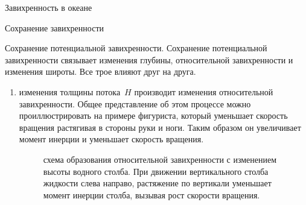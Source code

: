 \begin{chapter}{Завихренность в океане}
\begin{section}{Сохранение завихренности}
\begin{paragraph}{Сохранение потенциальной завихренности.}
Сохранение потенциальной завихренности связывает изменения глубины,
относительной завихренности и изменения широты. Все трое влияют друг
на друга.
%
\begin{enumerate}
\item
изменения толщины потока~$H$ производит изменения относительной
завихренности. Общее представление об этом процессе можно
проиллюстрировать на примере фигуриста, который уменьшает скорость
вращения растягивая в стороны руки и ноги. Таким образом он
увеличивает момент инерции и уменьшает скорость вращения.
%
%
\begin{figure}[h!]
\caption{схема образования относительной завихренности с изменением
высоты водного столба. При движении вертикального столба жидкости
слева направо, растяжение по вертикали уменьшает момент инерции
столба, вызывая рост скорости вращения.}
\label{fig:spinsketch}
\end{figure}
%


\end{enumerate}
\end{paragraph}
\end{section}
\end{chapter}

